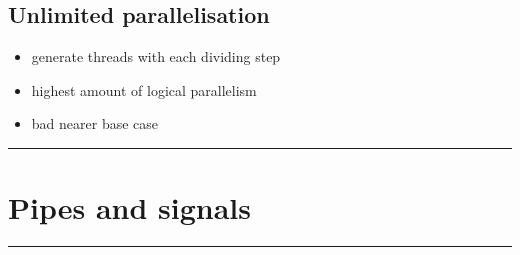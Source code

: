 \documentclass[10pt, multicolumn, a4paper]{article}
\begin{document}
\begin{multicols}{2}
	\subsection*{Unlimited parallelisation}
	\begin{itemize}
	\item generate threads with each dividing step
	\item highest amount of logical parallelism
	\item bad nearer base case
	\end{itemize}

\end{multicols}


\hrule
\section{Pipes and signals}
\hrule 
\end{document}

